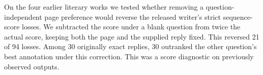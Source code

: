 On the four earlier literary works we tested whether removing a question-independent page preference would reverse the released writer's strict sequence-score losses. We subtracted the score under a blank question from twice the actual score, keeping both the page and the supplied reply fixed. This reversed 21 of 94 losses. Among 30 originally exact replies, 30 outranked the other question's best annotation under this correction. This was a score diagnostic on previously observed outputs.

